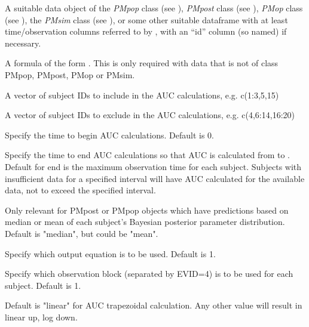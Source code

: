 \documentclass[a4paper]{book}
\begin{document}
\begin{Arguments}
\begin{ldescription}
\item[\code{data}] A suitable data object of the \emph{PMpop} class (see ),
\emph{PMpost} class (see ),
\emph{PMop} class (see ),
the \emph{PMsim} class (see ), or some other suitable dataframe
with at least time/observation columns referred to by , with an ``id'' column (so named) if necessary.

\item[\code{formula}] A formula of the form .  This is only required with data that is not of class PMpop, PMpost, PMop or PMsim.

\item[\code{include}] A vector of subject IDs to include in the AUC calculations, e.g. c(1:3,5,15)

\item[\code{exclude}] A vector of subject IDs to exclude in the AUC calculations, e.g. c(4,6:14,16:20)

\item[\code{start}] Specify the time to begin AUC calculations. Default is 0.

\item[\code{end}] Specify the time to end AUC calculations so that AUC is calculated
from  to .  Default for end is the maximum observation
time for each subject.  Subjects with insufficient data for a specified interval will have
AUC calculated for the available data, not to exceed the specified interval.

\item[\code{icen}] Only relevant for PMpost or PMpop objects which have predictions based on median or mean of each
subject's Bayesian posterior parameter distribution.  Default is "median", but could be "mean".

\item[\code{outeq}] Specify which output equation is to be used.  Default is 1.

\item[\code{block}] Specify which observation block (separated by EVID=4) is to be used for each subject.  Default is 1.

\item[\code{method}] Default is "linear" for AUC trapezoidal calculation.  Any other value will result in
linear up, log down.
\end{ldescription}
\end{Arguments}
\end{document}
